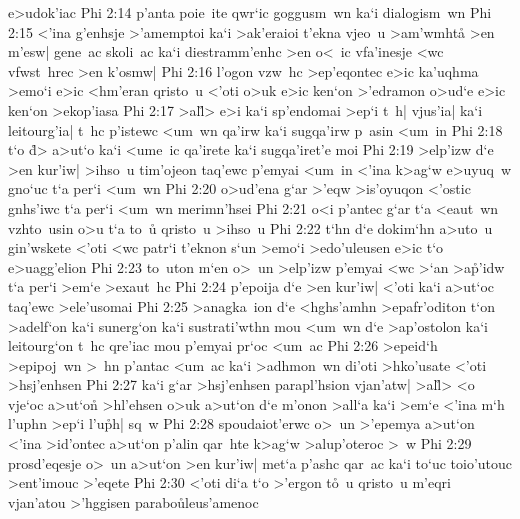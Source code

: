 e>udok'iac\bibvsend
\vs Phi 2:14
p'anta
poie~ite
qwr`ic
goggusm~wn
ka`i
dialogism~wn\bibvsend
\vs Phi 2:15
<'ina
g'enhsje
>'amemptoi
ka`i
>ak'eraioi
t'ekna
vjeo~u
>am'wmhta\r{}
>en
m'esw|
gene~ac
skoli~ac
ka`i
diestramm'enhc
>en
o<~ic
vfa'inesje
<wc
vfwst~hrec
>en
k'osmw|\bibvsend
\vs Phi 2:16
l'ogon
vzw~hc
>ep'eqontec
e>ic
ka'uqhma
>emo`i
e>ic
<hm'eran
qristo~u
<'oti
o>uk
e>ic
ken`on
>'edramon
o>ud`e
e>ic
ken`on
>ekop'iasa\bibvsend
\vs Phi 2:17
>al\r{l}>
e>i
ka`i
sp'endomai
>ep`i
t~h|
vjus'ia|
ka`i
leitourg'ia|
t~hc
p'istewc
<um~wn
qa'irw
ka`i
sugqa'irw
p~asin
<um~in\bibvsend
\vs Phi 2:18
t`o
\r{d}>
a>ut`o
ka`i
<ume~ic
qa'irete
ka`i
sugqa'iret'e
moi\bibvsend
\vs Phi 2:19
>elp'izw
d`e
>en
kur'iw|
>ihso~u
tim'ojeon
taq'ewc
p'emyai
<um~in
<'ina
k>ag`w
e>uyuq~w
gno`uc
t`a
per`i
<um~wn\bibvsend
\vs Phi 2:20
o>ud'ena
g`ar
>'eqw
>is'oyuqon
<'ostic
gnhs'iwc
t`a
per`i
<um~wn
merimn'hsei\bibvsend
\vs Phi 2:21
o<i
p'antec
g`ar
t`a
<eaut~wn
vzhto~usin
o>u
t`a
to~u\r{}
qristo~u
>ihso~u\bibvsend
\vs Phi 2:22
t`hn
d`e
dokim`hn
a>uto~u
gin'wskete
<'oti
<wc
patr`i
t'eknon
s`un
>emo`i
>edo'uleusen
e>ic
t`o
e>uagg'elion\bibvsend
\vs Phi 2:23
to~uton
m`en
o>~un
>elp'izw
p'emyai
<wc
>`an
>a\r{p}'idw
t`a
per`i
>em`e
>exaut~hc\bibvsend
\vs Phi 2:24
p'epoija
d`e
>en
kur'iw|
<'oti
ka`i
a>ut`oc
taq'ewc
>ele'usomai\bibvsend
\vs Phi 2:25
>anagka~ion
d`e
<hghs'amhn
>epafr'oditon
t`on
>adelf`on
ka`i
sunerg`on
ka`i
sustrati'wthn
mou
<um~wn
d`e
>ap'ostolon
ka`i
leitourg`on
t~hc
qre'iac
mou
p'emyai
pr`oc
<um~ac\bibvsend
\vs Phi 2:26
>epeid`h
>epipoj~wn
>~hn
p'antac
<um~ac
ka`i
>adhmon~wn
di'oti
>hko'usate
<'oti
>hsj'enhsen\bibvsend
\vs Phi 2:27
ka`i
g`ar
>hsj'enhsen
parapl'hsion
vjan'atw|
>al\r{l}>
<o
vje`oc
a>ut`on\r{}
>hl'ehsen
o>uk
a>ut`on
d`e
m'onon
>all`a
ka`i
>em`e
<'ina
m`h
l'uphn
>ep`i
l'u\r{p}h|
sq~w\bibvsend
\vs Phi 2:28
spoudaiot'erwc
o>~un
>'epemya
a>ut`on
<'ina
>id'ontec
a>ut`on
p'alin
qar~hte
k>ag`w
>alup'oteroc
>~w\bibvsend
\vs Phi 2:29
prosd'eqesje
o>~un
a>ut`on
>en
kur'iw|
met`a
p'ashc
qar~ac
ka`i
to`uc
toio'utouc
>ent'imouc
>'eqete\bibvsend
\vs Phi 2:30
<'oti
di`a
t`o
>'ergon
t\r{o}~u
qristo~u
m'eqri
vjan'atou
>'hggisen
parabo\r{u}leus'amenoc
